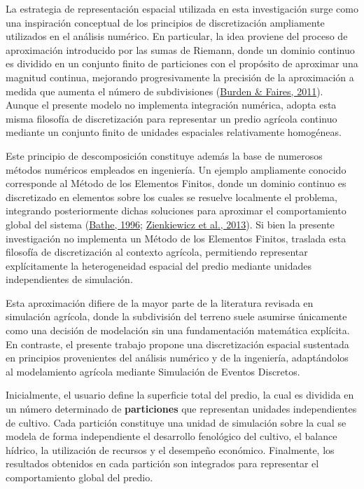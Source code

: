 \documentclass[12pt]{report}
\newcommand{\citeref}[2]{\hyperlink{ref:#1}{#2}}
\begin{document}
La estrategia de representación espacial utilizada en esta investigación surge como una inspiración conceptual de los principios de discretización ampliamente utilizados en el análisis numérico. En particular, la idea proviene del proceso de aproximación introducido por las sumas de Riemann, donde un dominio continuo es dividido en un conjunto finito de particiones con el propósito de aproximar una magnitud continua, mejorando progresivamente la precisión de la aproximación a medida que aumenta el número de subdivisiones (\citeref{burden2011}{Burden \& Faires, 2011}). Aunque el presente modelo no implementa integración numérica, adopta esta misma filosofía de discretización para representar un predio agrícola continuo mediante un conjunto finito de unidades espaciales relativamente homogéneas.

Este principio de descomposición constituye además la base de numerosos métodos numéricos empleados en ingeniería. Un ejemplo ampliamente conocido corresponde al Método de los Elementos Finitos, donde un dominio continuo es discretizado en elementos sobre los cuales se resuelve localmente el problema, integrando posteriormente dichas soluciones para aproximar el comportamiento global del sistema (\citeref{bathe1996}{Bathe, 1996}; \citeref{zienkiewicz2013}{Zienkiewicz et al., 2013}). Si bien la presente investigación no implementa un Método de los Elementos Finitos, traslada esta filosofía de discretización al contexto agrícola, permitiendo representar explícitamente la heterogeneidad espacial del predio mediante unidades independientes de simulación.

Esta aproximación difiere de la mayor parte de la literatura revisada en simulación agrícola, donde la subdivisión del terreno suele asumirse únicamente como una decisión de modelación sin una fundamentación matemática explícita. En contraste, el presente trabajo propone una discretización espacial sustentada en principios provenientes del análisis numérico y de la ingeniería, adaptándolos al modelamiento agrícola mediante Simulación de Eventos Discretos.

Inicialmente, el usuario define la superficie total del predio, la cual es dividida en un número determinado de \textbf{particiones} que representan unidades independientes de cultivo. Cada partición constituye una unidad de simulación sobre la cual se modela de forma independiente el desarrollo fenológico del cultivo, el balance hídrico, la utilización de recursos y el desempeño económico. Finalmente, los resultados obtenidos en cada partición son integrados para representar el comportamiento global del predio.
\end{document}
